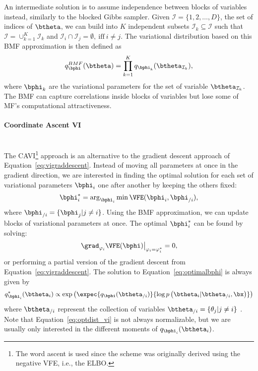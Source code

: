 An intermediate solution is to assume independence between blocks of variables instead, similarly to the blocked Gibbs sampler.
Given $\mathcal{I}=\{1,2,\ldots,D\}$, the set of indices of $\btheta$, we can build into $K$ independent subsets $\mathcal{I}_k \subseteq \mathcal{I}$ such that  $\mathcal{I} = \cup_{k=1}^K \mathcal{I}_{k}$ and $\mathcal{I}_i \cap \mathcal{I}_j=\emptyset,~\mathrm{iff}~i \neq j$.
The variational distribution based on this \ac{BMF} approximation is then defined as
\begin{align}
    q^{BMF}_{\bphi}(\btheta) = \prod_{k=1}^K q_{\bphi_k}(\btheta_{\mathcal{I}_k}),
\end{align}
where $\bphi_k$ are the variational parameters for the set of variable $\btheta_{\mathcal{I}_k}$.
The \ac{BMF} can capture correlations inside blocks of variables but lose some of \ac{MF}'s computational attractiveness.

\paragraph{Coordinate Ascent VI}\mbox{}\\
\label{sec:cavi}
The \ac{CAVI}\footnote{The word ascent is used since the scheme was originally derived using the negative \ac{VFE}, i.e., the \ac{ELBO}.} approach is an alternative to the gradient descent approach of Equation~\eqref{eq:vigraddescent}.
Instead of moving all parameters at once in the gradient direction, we are interested in finding the optimal solution for each set of variational parameters $\bphi_i$ one after another by keeping the others fixed:
\begin{align}
    \bphi_i^* = \arg_{\bphi_i}\min \VFE(\bphi_i, \bphi_{/i}),
    \label{eq:optimalbphi}
\end{align}
where $\bphi_{/i} = \{\bphi_j | j \neq i\}$.
Using the \ac{BMF} approximation, we can update blocks of variational parameters at once.
The optimal $\bphi_i^*$ can be found by solving:
\begin{align}
\left.\grad_{\varphi_i}\VFE(\bphi)\right\vert_{\varphi_i=\varphi_i^*} = 0,
\end{align}
or performing a partial version of the gradient descent from Equation~\eqref{eq:vigraddescent}.
The solution to Equation~\eqref{eq:optimalbphi} is always given by
\begin{align}
q_{\bphi_i}^*(\btheta_i) \propto \exp\left(\expec{q_{\bphi}(\btheta_{/i})}{\log p\left(\btheta_i|\btheta_{/i},\bx\right)}\right)\label{eq:optdist_vi}
\end{align}
where $\btheta_{/i}$ represent the collection of variables $\btheta_{/i} = \{\theta_j | j \neq i\}$ \cite{murphyMachineLearningProbabilistic2012}.
Note that Equation~\eqref{eq:optdist_vi} is not always normalizable, but we are usually only interested in the different moments of $q_{\bphi_i}(\btheta_i)$.

